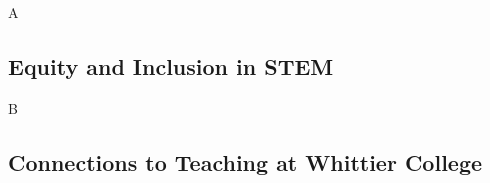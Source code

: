 \documentclass[../../../main.tex]{subfiles}
\begin{document}
A

\subsection{Equity and Inclusion in STEM}

B

\subsection{Connections to Teaching at Whittier College}
\end{document}
